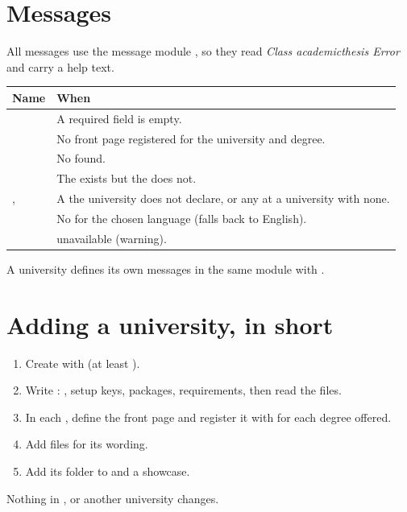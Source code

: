 \section{Messages}

All messages use the  message module , so
they read \emph{Class academicthesis Error} and carry a help text.

\begin{tabularx}{\textwidth}{@{}l Y@{}}
\toprule
\textbf{Name} & \textbf{When} \\
\midrule
{} & A required field is empty. \\
 & No front page registered for the university and degree. \\
 & No  found. \\
 & The  exists but the  does not. \\
,  & A  the university does not declare, or any  at a university with none. \\
 & No  for the chosen language (falls back to English). \\
 &  unavailable (warning). \\
\bottomrule
\end{tabularx}

A university defines its own messages in the same module with
.

\section{Adding a university, in short}

\begin{enumerate}
  \item Create  with
     (at least ).
  \item Write : 
    , setup keys, packages, requirements,
    then read the  files.
  \item In each , define the front page and register it with
     for each degree offered.
  \item Add  files for its wording.
  \item Add its folder to 
    and a showcase.
\end{enumerate}

Nothing in ,  or another university changes.
